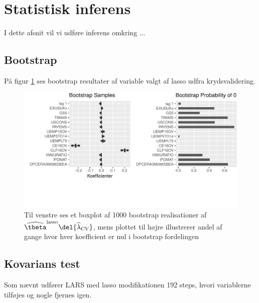 \section{Statistisk inferens}
I dette afsnit vil vi udføre inferens omkring ...

\subsection{Bootstrap}
På figur \ref{fig:bootstrap_lasso} ses bootstrap resultater af variable valgt af lasso udfra krydsvalidering.


\begin{figure}
\includegraphics[scale=0.75, clip, trim=0 2.5cm 0 0]{fig/img/bootstrap_lasso.pdf}
\caption{Til venstre ses et boxplot af 1000 bootstrap realisationer af \(\widehat{\tbeta}^\text{lasso} \del{\widehat{\lambda}_\text{CV}}\), mens plottet til højre illustrerer andel af gange hvor hver koefficient er nul i bootstrap fordelingen}
\label{fig:bootstrap_lasso}
\end{figure}








\newpage
\subsection{Kovarians test}
Som nævnt udfører LARS med lasso modifikationen 192 steps, hvori variablerne tilføjes og nogle fjernes igen.



